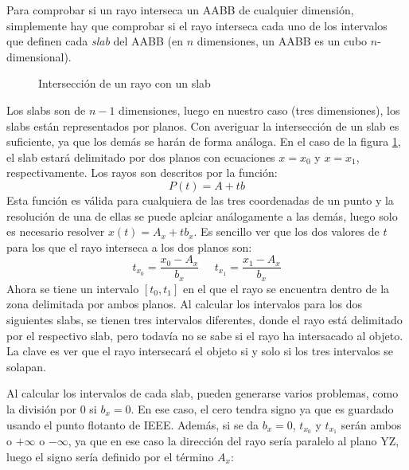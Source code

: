 \documentclass[12pt]{article}
\theoremstyle{definition}
\theoremstyle{remark}
\begin{document}
Para comprobar si un rayo interseca un AABB de cualquier dimensión, simplemente hay que comprobar si el rayo interseca cada uno de los intervalos que definen cada \textit{slab} del AABB (en $n$ dimensiones, un AABB es un cubo $n$-dimensional).

\begin{figure}[H]
\centering
{}
\caption{Intersección de un rayo con un slab}\label{slab_intersection}
\end{figure}

Los slabs son de $n-1$ dimensiones, luego en nuestro caso (tres dimensiones), los slabs están representados por planos. Con averiguar la intersección de un slab es suficiente, ya que los demás se harán de forma análoga. En el caso de la figura \ref{slab_intersection}, el slab estará delimitado por dos planos con ecuaciones $x=x_0$ y $x=x_1$, respectivamente. Los rayos son descritos por la función:
\[
P(t)=A+tb
\]
Esta función es válida para cualquiera de las tres coordenadas de un punto y la resolución de una de ellas se puede aplciar análogamente a las demás, luego solo es necesario resolver $x(t)=A_x+tb_x$. Es sencillo ver que los dos valores de $t$ para los que el rayo interseca a los dos planos son:
\[
t_{x_0}=\frac{x_0-A_x}{b_x} \;\;\;\;\; t_{x_1}=\frac{x_1-A_x}{b_x}
\]
Ahora se tiene un intervalo $[t_0,t_1]$ en el que el rayo se encuentra dentro de la zona delimitada por ambos planos. Al calcular los intervalos para los dos siguientes slabs, se tienen tres intervalos diferentes, donde el rayo está delimitado por el respectivo slab, pero todavía no se sabe si el rayo ha intersacado al objeto. La clave es ver que el rayo intersecará el objeto si y solo si los tres intervalos se solapan.

Al calcular los intervalos de cada slab, pueden generarse varios problemas, como la división por 0 si $b_x=0$. En ese caso, el cero tendra signo ya que es guardado usando el punto flotanto de IEEE. Además, si se da $b_x=0$, $t_{x_0}$ y $t_{x_1}$ serán ambos o $+\infty$ o $-\infty$, ya que en ese caso la dirección del rayo sería paralelo al plano YZ, luego el signo sería definido por el término $A_x$:
\end{document}
